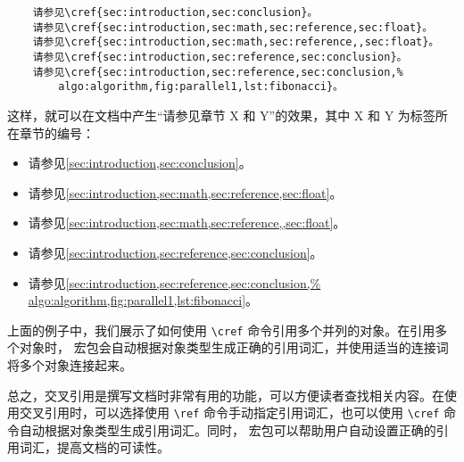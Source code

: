 \begin{Verbatim}
    请参见\cref{sec:introduction,sec:conclusion}。
    请参见\cref{sec:introduction,sec:math,sec:reference,sec:float}。
    请参见\cref{sec:introduction,sec:math,sec:reference,,sec:float}。
    请参见\cref{sec:introduction,sec:reference,sec:conclusion}。
    请参见\cref{sec:introduction,sec:reference,sec:conclusion,%
        algo:algorithm,fig:parallel1,lst:fibonacci}。
\end{Verbatim}

这样，就可以在文档中产生“请参见章节 X 和 Y”的效果，其中 X 和 Y 为标签所在章节的编号：
\begin{itemize}
    \item 请参见\cref{sec:introduction,sec:conclusion}。
    \item 请参见\cref{sec:introduction,sec:math,sec:reference,sec:float}。
    \item 请参见\cref{sec:introduction,sec:math,sec:reference,,sec:float}。
    \item 请参见\cref{sec:introduction,sec:reference,sec:conclusion}。
    \item 请参见\cref{sec:introduction,sec:reference,sec:conclusion,%
              algo:algorithm,fig:parallel1,lst:fibonacci}。
\end{itemize}

上面的例子中，我们展示了如何使用 \verb|\cref| 命令引用多个并列的对象。在引用多个对象时， 宏包会自动根据对象类型生成正确的引用词汇，并使用适当的连接词将多个对象连接起来。

总之，交叉引用是撰写文档时非常有用的功能，可以方便读者查找相关内容。在使用交叉引用时，可以选择使用 \verb|\ref| 命令手动指定引用词汇，也可以使用 \verb|\cref| 命令自动根据对象类型生成引用词汇。同时， 宏包可以帮助用户自动设置正确的引用词汇，提高文档的可读性。